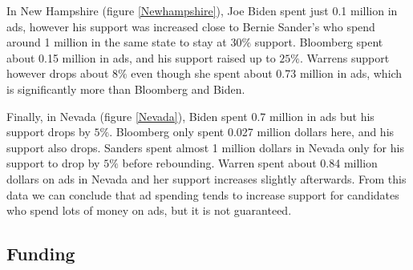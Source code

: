 In New Hampshire (figure \ref{Newhampshire}), Joe Biden spent just 0.1 million in ads, however his support was increased close to Bernie Sander's who spend around 1 million in the same state to stay at $30\%$ support. Bloomberg spent about 0.15 million in ads, and his support raised up to $25\%$. Warrens support however drops about $8\%$ even though she spent about 0.73 million in ads, which is significantly more than Bloomberg and Biden. 

Finally, in Nevada (figure \ref{Nevada}), Biden spent 0.7 million in ads but his support drops by $5\%$. Bloomberg only spent 0.027 million dollars here, and his support also drops. Sanders spent almost 1 million dollars in Nevada only for his support to drop by $5\%$ before rebounding. Warren spent about 0.84 million dollars on ads in Nevada and her support increases slightly afterwards. From this data we can conclude that ad spending tends to increase support for candidates who spend lots of money on ads, but it is not guaranteed.

\subsection{Funding}
